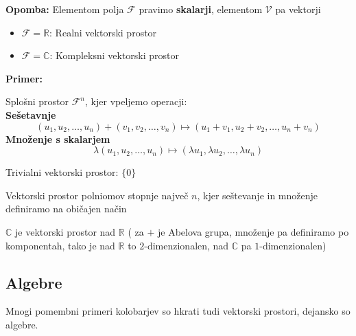 \documentclass[a4paper]{article}
\newcounter{environment:definition_counter}
\newcounter{environment:theorem_counter}
\newcounter{environment:statement_counter}
\newcounter{example:example_counter}
\newenvironment{example}
{\textbf{Primer:}\\}
{\setcounter{example:example_counter}{0}}
\newenvironment{example_case}
{\refstepcounter{example:example_counter} \arabic{example:example_counter}.}
{\\}
\newenvironment{remark}
{\textbf{Opomba:}}
{}
\begin{document}
\begin{remark}
Elementom polja $\mathcal{F}$ pravimo \textbf{skalarji}, elementom $\mathcal{V}$ pa vektorji
\end{remark}

\begin{itemize}
\item $\mathcal{F} = \mathbb{R}$: Realni vektorski prostor
\item $\mathcal{F} = \mathbb{C}$: Kompleksni vektorski prostor

\end{itemize}

\begin{example}
\begin{example_case}
Splošni prostor $\mathcal{F}^n$, kjer vpeljemo operacji:\\
\textbf{Sešetavnje}
\begin{equation}
\label{eq:vector_space_addition}
(u_1, u_2, \dots , u_n) + (v_1, v_2, \dots, v_n) \mapsto (u_1 + v_1, u_2 + v_2, \dots, u_n + v_n)
\end{equation}
\textbf{Množenje s skalarjem}
\begin{equation}
\label{eq:vector_space_scalar_multiplication}
\lambda (u_1, u_2, \dots , u_n) \mapsto (\lambda u_1 , \lambda u_2 , \dots, \lambda u_n)
\end{equation}
\end{example_case}
\begin{example_case}
Trivialni vektorski prostor: $\{0\}$
\end{example_case}
\begin{example_case}
Vektorski prostor polniomov stopnje največ $n$, kjer seštevanje in množenje definiramo na običajen način
\end{example_case}
\begin{example_case}
$\mathbb{C}$ je vektorski prostor nad $\mathbb{R}$ ( za $+$ je Abelova grupa, množenje pa definiramo po komponentah, tako je nad $\mathbb{R}$ to $2$-dimenzionalen, nad $\mathbb{C}$ pa $1$-dimenzionalen)
\end{example_case}
\end{example}

\subsection{Algebre}
Mnogi pomembni primeri kolobarjev so hkrati tudi vektorski prostori, dejansko so algebre.
\end{document}
